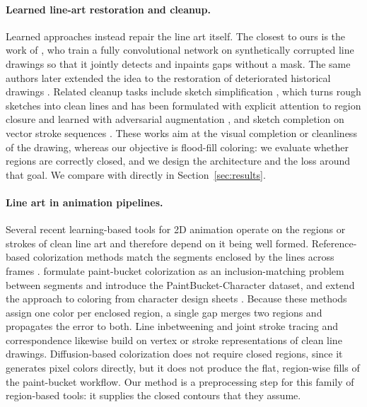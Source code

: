 \documentclass[pdflatex,sn-mathphys-num]{sn-jnl}%
\begin{document}
\paragraph{Learned line-art restoration and cleanup.}
Learned approaches instead repair the line art itself. The closest to ours is the
work of \citet{sasaki2017joint}, who train a fully convolutional network on
synthetically corrupted line drawings so that it jointly detects and inpaints gaps
without a mask. The same authors later extended the idea to the restoration of deteriorated
historical drawings \citep{sasaki2018restore}. Related cleanup tasks include sketch
simplification \citep{simoserra2016simplify}, which turns rough sketches into clean lines and has been formulated
with explicit attention to region closure \citep{liu2015closure} and learned with
adversarial augmentation \citep{simoserra2018mastering}, and sketch completion on
vector stroke sequences \citep{lin2020sketchbert}. These works aim at the visual
completion or cleanliness of the drawing, whereas our objective is flood-fill
coloring: we evaluate whether regions are correctly closed, and we design the
architecture and the loss around that goal. We compare with
\citet{sasaki2017joint} directly in Section~\ref{sec:results}.

\paragraph{Line art in animation pipelines.} 
Several recent learning-based tools for 2D animation operate on the regions or
strokes of clean line art and therefore depend on it being well formed.
Reference-based colorization methods match the segments enclosed by the lines
across frames \citep{casey2021animation}. \citet{dai2024inclusion} formulate
paint-bucket colorization as an inclusion-matching problem between segments and
introduce the PaintBucket-Character dataset, and extend the approach to coloring
from character design sheets \citep{dai2024designsheets}. Because these methods
assign one color per enclosed region, a single gap merges two regions and propagates
the error to both. Line inbetweening \citep{siyao2023inbetween} and joint stroke
tracing and correspondence \citep{mo2024jostc} likewise build on vertex or stroke
representations of clean line drawings. Diffusion-based colorization
\citep{liu2025manganinja} does not require closed regions, since it generates
pixel colors directly, but it does not produce the flat, region-wise fills of the
paint-bucket workflow. Our method is a preprocessing step for this family of
region-based tools: it supplies the closed contours that they assume.
\end{document}
